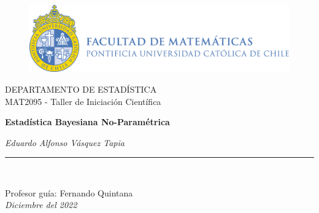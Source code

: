 \begin{titlepage}
\begin{center}

\vspace*{-0.7in}
\begin{figure}[htb]
\begin{center}
\includegraphics[width=12cm]{figures/logo.png}
\end{center}
\end{figure}
\Large DEPARTAMENTO DE ESTADÍSTICA\\

\Large MAT2095 - Taller de Iniciación Científica\\
\vspace*{1in}

\begin{large}

\Huge \textbf{Estadística Bayesiana No-Paramétrica} \\
\end{large}
\vspace*{1.2in}

\vspace*{0.5in}
\begin{large}
\textit{Eduardo Alfonso Vásquez Tapia}\\
\end{large}
\vspace*{0.5in}
\rule{80mm}{0.1mm}\\
\vspace*{0.5in}
\begin{large}
Profesor guía: Fernando Quintana \\
\vspace*{0.5in}
\textit{Diciembre del 2022}
\end{large}
\end{center}
\end{titlepage}